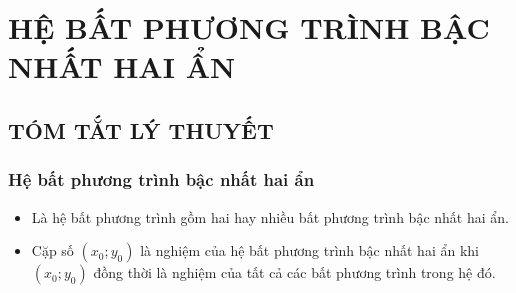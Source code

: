 \section{HỆ BẤT PHƯƠNG TRÌNH BẬC NHẤT HAI ẨN}

\subsection{TÓM TẮT LÝ THUYẾT}
\subsubsection{Hệ bất phương trình bậc nhất hai ẩn}
\begin{itemize}
	\item [\iconMT] Là hệ bất phương trình gồm hai hay nhiều bất phương trình bậc nhất hai ẩn.
	\item [\iconMT] Cặp số $(x_0;y_0)$ là nghiệm của hệ bất phương trình bậc nhất hai ẩn khi $(x_0;y_0)$ đồng thời là nghiệm của tất cả các bất phương trình trong hệ đó.
\end{itemize}
